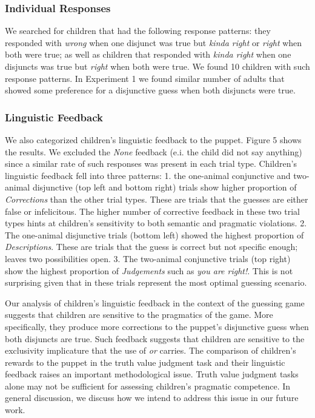 \documentclass[10pt, letterpaper]{article}
\begin{document}
\subsubsection{Individual Responses}\label{individual-responses-1}

We searched for children that had the following response patterns: they
responded with \emph{wrong} when one disjunct was true but \emph{kinda
right} or \emph{right} when both were true; as well as children that
responded with \emph{kinda right} when one disjuncts was true but
\emph{right} when both were true. We found 10 children with such
response patterns. In Experiment 1 we found similar number of adults
that showed some preference for a disjunctive guess when both disjuncts
were true.

\subsubsection{Linguistic Feedback}\label{linguistic-feedback}

We also categorized children's linguistic feedback to the puppet. Figure
5 shows the results. We excluded the \emph{None} feedback (e.i. the
child did not say anything) since a similar rate of such responses was
present in each trial type. Children's linguistic feedback fell into
three patterns: 1. the one-animal conjunctive and two-animal disjunctive
(top left and bottom right) trials show higher proportion of
\emph{Corrections} than the other trial types. These are trials that the
guesses are either false or infelicitous. The higher number of
corrective feedback in these two trial types hints at children's
sensitivity to both semantic and pragmatic violations. 2. The one-animal
disjunctive trials (bottom left) showed the highest proportion of
\emph{Descriptions}. These are trials that the guess is correct but not
specific enough; leaves two possibilities open. 3. The two-animal
conjunctive trials (top right) show the highest proportion of
\emph{Judgements} such as \emph{you are right!}. This is not surprising
given that in these trials represent the most optimal guessing scenario.

Our analysis of children's linguistic feedback in the context of the
guessing game suggests that children are sensitive to the pragmatics of
the game. More specifically, they produce more corrections to the
puppet's disjunctive guess when both disjuncts are true. Such feedback
suggests that children are sensitive to the exclusivity implicature that
the use of \emph{or} carries. The comparison of children's rewards to
the puppet in the truth value judgment task and their linguistic
feedback raises an important methodological issue. Truth value judgment
tasks alone may not be sufficient for assessing children's pragmatic
competence. In general discussion, we discuss how we intend to address
this issue in our future work.
\end{document}
